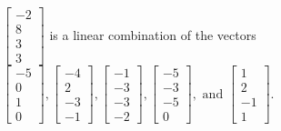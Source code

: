 \begin{exercise}
\begin{exerciseStatement}
  \end{exerciseStatement}
  \begin{exerciseAnswer}
   \(\left[\begin{array}{c}
-2 \\
8 \\
3 \\
3
\end{array}\right]\) 
  	 is  
	a linear combination of the vectors \(\left[\begin{array}{c}
-5 \\
0 \\
1 \\
0
\end{array}\right] , \left[\begin{array}{c}
-4 \\
2 \\
-3 \\
-1
\end{array}\right] , \left[\begin{array}{c}
-1 \\
-3 \\
-3 \\
-2
\end{array}\right] , \left[\begin{array}{c}
-5 \\
-3 \\
-5 \\
0
\end{array}\right] , \text{ and } \left[\begin{array}{c}
1 \\
2 \\
-1 \\
1
\end{array}\right]\).

	
  


  \end{exerciseAnswer}
\end{exercise}